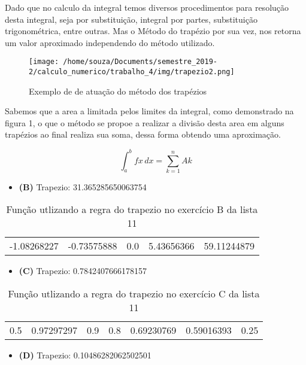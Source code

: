\documentclass[12pt]{article}
\begin{document}
 Dado que no calculo da integral temos diversos procedimentos para resolução desta integral, seja por substituição, integral por partes, substituição trigonométrica, entre outras. Mas o Método do trapézio por sua vez, nos retorna um valor aproximado independendo do método utilizado.

\begin{figure}[ht]
    \centering
    \texttt{[image: /home/souza/Documents/semestre\_2019-2/calculo\_numerico/trabalho\_4/img/trapezio2.png]}
    \caption{Exemplo de de atuação do método dos trapézios}
\end{figure}

Sabemos que a area a limitada pelos limites da integral, como demonstrado na figura 1, o que o método se propoe a realizar a divisão desta area em alguns trapézios ao final realiza sua soma, dessa forma obtendo uma aproximação.


 \[\int_{a}^{b} \! fx \, dx = \sum_{k=1}^{n}Ak \]

\begin{itemize}
    \item \textbf{(B)} Trapezio: 31.365285650063754
\end{itemize}

\begin{table}[ht]
\centering
\begin{tabular}{|lllll|}
-1.08268227 & -0.73575888 & 0.0 & 5.43656366 & 59.11244879
\end{tabular}
    \caption{Função utlizando a regra do trapezio no exercício B da lista 11}
\end{table}


\begin{itemize}
    \item \textbf{(C)} Trapezio: 0.7842407666178157
\end{itemize}

\begin{table}[ht]
\centering
\begin{tabular}{|lllllll|}
  0.5 & 0.97297297 & 0.9 & 0.8 & 0.69230769 & 0.59016393 & 0.25
\end{tabular}
    \caption{Função utlizando a regra do trapezio no exercício C da lista 11}
\end{table}


\begin{itemize}
    \item \textbf{(D)} Trapezio: 0.10486282062502501
\end{itemize}
\end{document}
